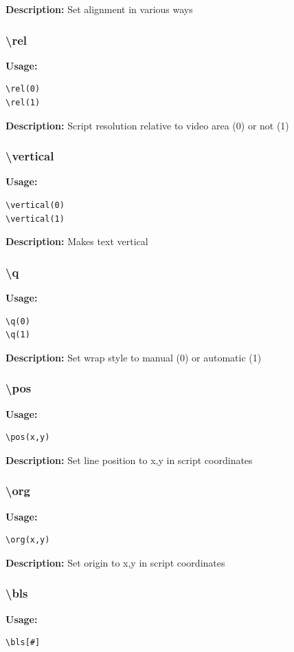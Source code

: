 \documentclass{spec}
\begin{document}
\textbf{Description:}
Set alignment in various ways

\subsubsection{\textbackslash rel}
\textbf{Usage:}
\begin{verbatim}
\rel(0)
\rel(1)
\end{verbatim}

\textbf{Description:}
Script resolution relative to video area (0) or not (1)

\subsubsection{\textbackslash vertical}
\textbf{Usage:}
\begin{verbatim}
\vertical(0)
\vertical(1)
\end{verbatim}

\textbf{Description:}
Makes text vertical

\subsubsection{\textbackslash q}
\textbf{Usage:}
\begin{verbatim}
\q(0)
\q(1)
\end{verbatim}

\textbf{Description:}
Set wrap style to manual (0) or automatic (1)

\subsubsection{\textbackslash pos}
\textbf{Usage:}
\begin{verbatim}
\pos(x,y)
\end{verbatim}

\textbf{Description:}
Set line position to x,y in script coordinates

\subsubsection{\textbackslash org}
\textbf{Usage:}
\begin{verbatim}
\org(x,y)
\end{verbatim}

\textbf{Description:}
Set origin to x,y in script coordinates

\subsubsection{\textbackslash bls}
\textbf{Usage:}
\begin{verbatim}
\bls[#]
\end{verbatim}
\end{document}
